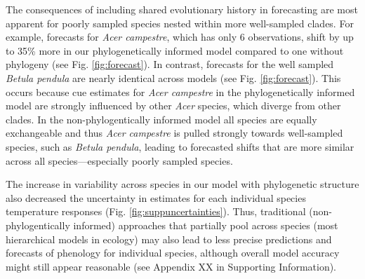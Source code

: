 \documentclass[11pt]{article}
\begin{document}
The consequences of including shared evolutionary history in forecasting are most apparent for poorly sampled species nested within more well-sampled clades. For example, forecasts for \emph{Acer campestre}, which has only 6 observations, shift by up to 35\% more in our phylogenetically informed model compared to one without phylogeny (see Fig. \ref{fig:forecast}). In contrast, forecasts for the well sampled  \emph{Betula pendula} are nearly identical across models (see Fig. \ref{fig:forecast}). This occurs because cue estimates for \emph{Acer campestre} in the phylogenetically informed model are strongly influenced by other \emph{Acer} species, which diverge from other clades. In the non-phylogentically informed model all species are equally exchangeable and thus \emph{Acer campestre} is pulled strongly towards well-sampled species, such as \emph{Betula pendula}, leading to forecasted shifts that are more similar across all species---especially poorly sampled species. 

The increase in variability across species in our model with phylogenetic structure also decreased the uncertainty in estimates for each individual species temperature responses (Fig. \ref{fig:suppuncertainties}). Thus, traditional (non-phylogentically informed) approaches that partially pool across species (most hierarchical models in ecology) may also lead to less precise predictions and forecasts of phenology for individual species, although overall model accuracy might still appear reasonable (see Appendix XX in Supporting Information).

\end{document}
